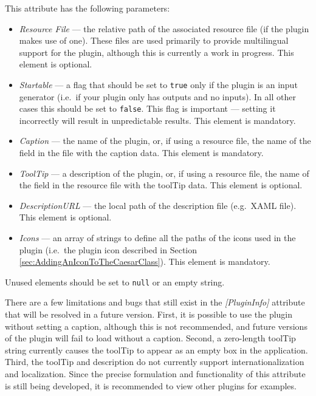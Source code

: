 \noindent This attribute has the following parameters:

\begin{itemize}
	\item \textit{Resource File} --- the relative path of the associated resource file (if the plugin makes use of one). These files are used primarily to provide multilingual support for the plugin, although this is currently a work in progress. This element is optional.
	\item \textit{Startable} --- a flag that should be set to \texttt{true} only if the plugin is an input generator (i.e.\ if your plugin only has outputs and no inputs). In all other cases this should be set to \texttt{false}. This flag is important --- setting it incorrectly will result in unpredictable results. This element is mandatory.
	\item \textit{Caption} --- the name of the plugin, or, if using a resource file, the name of the field in the file with the caption data. This element is mandatory.
	\item \textit{ToolTip} --- a description of the plugin, or, if using a resource file, the name of the field in the resource file with the toolTip data. This element is optional.
	\item \textit{DescriptionURL} --- the local path of the description file (e.g.\ XAML file). This element is optional.
	\item \textit{Icons} --- an array of strings to define all the paths of the icons used in the plugin (i.e.\ the plugin icon described in Section \ref{sec:AddingAnIconToTheCaesarClass}). This element is mandatory.
\end{itemize}

\noindent Unused elements should be set to \texttt{null} or an empty string.

There are a few limitations and bugs that still exist in the \textit{[PluginInfo]} attribute that will be resolved in a future version. First, it is possible to use the plugin without setting a caption, although this is not recommended, and future versions of the plugin will fail to load without a caption. Second, a zero-length toolTip string currently causes the toolTip to appear as an empty box in the application. Third, the toolTip and description do not currently support internationalization and localization. Since the precise formulation and functionality of this attribute is still being developed, it is recommended to view other plugins for examples.

